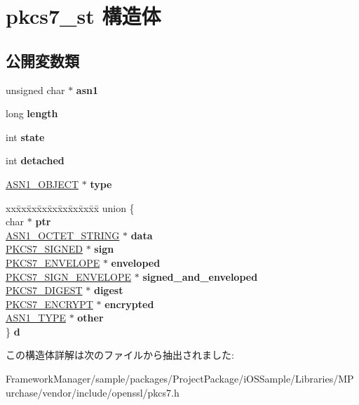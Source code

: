 \hypertarget{structpkcs7__st}{}\section{pkcs7\+\_\+st 構造体}
\label{structpkcs7__st}
\subsection*{公開変数類}
\begin{DoxyCompactItemize}
\item 
\hypertarget{structpkcs7__st_ab1fc765421d37e4483b30cf1f12123d5}{}unsigned char $\ast$ {\bfseries asn1}\label{structpkcs7__st_ab1fc765421d37e4483b30cf1f12123d5}

\item 
\hypertarget{structpkcs7__st_a565b91c0f8c20b54770879e006bd41ee}{}long {\bfseries length}\label{structpkcs7__st_a565b91c0f8c20b54770879e006bd41ee}

\item 
\hypertarget{structpkcs7__st_a347c4591ec3bcf75f4dd86b430b20426}{}int {\bfseries state}\label{structpkcs7__st_a347c4591ec3bcf75f4dd86b430b20426}

\item 
\hypertarget{structpkcs7__st_aaefed5b8e3dc5995f7fb1e1a300b7668}{}int {\bfseries detached}\label{structpkcs7__st_aaefed5b8e3dc5995f7fb1e1a300b7668}

\item 
\hypertarget{structpkcs7__st_acd92bf461725525e7785077578ccf226}{}\hyperlink{structasn1__object__st}{A\+S\+N1\+\_\+\+O\+B\+J\+E\+C\+T} $\ast$ {\bfseries type}\label{structpkcs7__st_acd92bf461725525e7785077578ccf226}

\item 
\hypertarget{structpkcs7__st_a6da670f9831f55522b3782fadb3c4a2a}{}\begin{tabbing}
xx\=xx\=xx\=xx\=xx\=xx\=xx\=xx\=xx\=\kill
union \{\\
\>char $\ast$ {\bfseries ptr}\\
\>\hyperlink{structasn1__string__st}{ASN1\_OCTET\_STRING} $\ast$ {\bfseries data}\\
\>\hyperlink{structpkcs7__signed__st}{PKCS7\_SIGNED} $\ast$ {\bfseries sign}\\
\>\hyperlink{structpkcs7__enveloped__st}{PKCS7\_ENVELOPE} $\ast$ {\bfseries enveloped}\\
\>\hyperlink{structpkcs7__signedandenveloped__st}{PKCS7\_SIGN\_ENVELOPE} $\ast$ {\bfseries signed\_and\_enveloped}\\
\>\hyperlink{structpkcs7__digest__st}{PKCS7\_DIGEST} $\ast$ {\bfseries digest}\\
\>\hyperlink{structpkcs7__encrypted__st}{PKCS7\_ENCRYPT} $\ast$ {\bfseries encrypted}\\
\>\hyperlink{structasn1__type__st}{ASN1\_TYPE} $\ast$ {\bfseries other}\\
\} {\bfseries d}\label{structpkcs7__st_a6da670f9831f55522b3782fadb3c4a2a}
\\

\end{tabbing}\end{DoxyCompactItemize}


この構造体詳解は次のファイルから抽出されました\+:\begin{DoxyCompactItemize}
\item 
Framework\+Manager/sample/packages/\+Project\+Package/i\+O\+S\+Sample/\+Libraries/\+M\+Purchase/vendor/include/openssl/pkcs7.\+h\end{DoxyCompactItemize}
